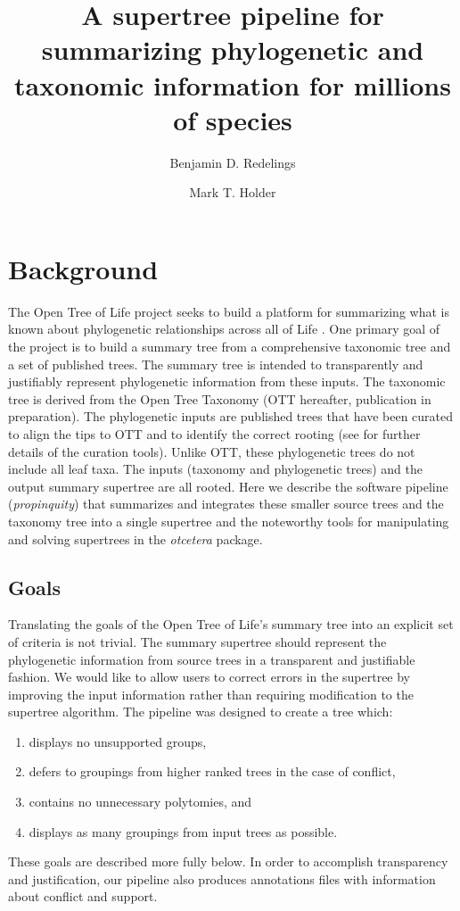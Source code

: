 \documentclass[fleqn,12pt,lineno,english]{wlpeerj}
\title{A supertree pipeline for summarizing phylogenetic and taxonomic information
for millions of species}
\author[1,2]{Benjamin D. Redelings}
\author[2,3,4]{Mark T. Holder}
\affil[1]{Department of Biology, Duke University, Durham NC, US}
\affil[2]{Department of Ecology and Evolutionary Biology, University of Kansas, Lawrence KS, US}
\affil[3]{Biodiversity Institute, University of Kansas, Lawrence KS, US}
\affil[4]{Heidelberg Institute for Theoretical Studies, Heidelberg, Germany}
\begin{document}
\flushbottom
\maketitle
\thispagestyle{empty}



\section{Background}

The Open Tree of Life project seeks to build a platform for summarizing
what is known about phylogenetic relationships across all of Life
\citep{HinchliffEtAl2015}. One primary goal of the project is to
build a summary tree from a comprehensive taxonomic tree and a set
of published trees. The summary tree is intended to transparently
and justifiably represent phylogenetic information from these inputs.
The taxonomic tree is derived from the Open Tree Taxonomy (OTT hereafter,
publication in preparation). The phylogenetic inputs are published
trees that have been curated to align the tips to OTT and to identify
the correct rooting (see \citealt{McTavishEtAt2015} for further details
of the curation tools). Unlike OTT, these phylogenetic trees do not
include all leaf taxa. The inputs (taxonomy and phylogenetic trees)
and the output summary supertree are all rooted. Here we describe
the software pipeline (\emph{propinquity}) that summarizes and integrates
these smaller source trees and the taxonomy tree into a single supertree
and the noteworthy tools for manipulating and solving supertrees in
the \emph{otcetera} package.

\subsection{Goals}

Translating the goals of the Open Tree of Life's summary tree into
an explicit set of criteria is not trivial. The summary supertree
should represent the phylogenetic information from source trees in
a transparent and justifiable fashion. We would like to allow users
to correct errors in the supertree by improving the input information
rather than requiring modification to the supertree algorithm. The
pipeline was designed to create a tree which:
\begin{enumerate}
\item displays no unsupported groups,
\item defers to groupings from higher ranked trees in the case of conflict, 
\item contains no unnecessary polytomies, and
\item displays as many groupings from input trees as possible.
\end{enumerate}
These goals are described more fully below. In order to accomplish
transparency and justification, our pipeline also produces annotations
files with information about conflict and support.
\end{document}
